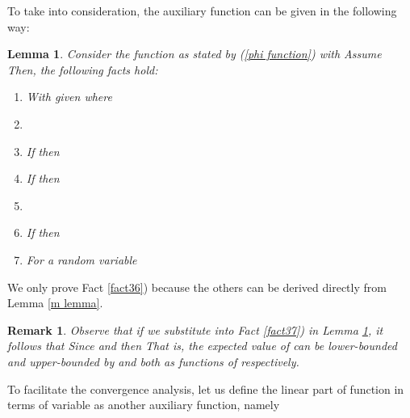 \documentclass[journal]{IEEEtran}
\newtheorem{lemma}{Lemma}
\newtheorem{remark}{Remark}
\begin{document}
To take  into consideration, the auxiliary function  can be given in the following way:


\begin{lemma}\label{varphi lemma}
Consider the function  as stated by (\ref{phi function}) with   Assume  Then, the following facts hold:
\begin{enumerate}
\item With given  
    where \label{fact31}
\item  \label{fact32}
\item If  then  \label{fact33}
\item If  then \label{fact34}
\item \label{fact35}
\item If  then  \label{fact36}
\item For a random variable  \label{fact37}
\end{enumerate}
\end{lemma}
\begin{IEEEproof}
We only prove Fact \ref{fact36}) because the others can be derived directly from Lemma \ref{m lemma}.{}
\end{IEEEproof}


\begin{remark}\label{p bound}
Observe that if we substitute  into Fact \ref{fact37}) in Lemma \ref{varphi lemma}, it follows that  Since  and  then  That is, the expected value of  can be lower-bounded and upper-bounded by  and  both as functions of  respectively.
\end{remark}

To facilitate the convergence analysis, let us define the linear part of function  in terms of variable  as another auxiliary function, namely
\end{document}
